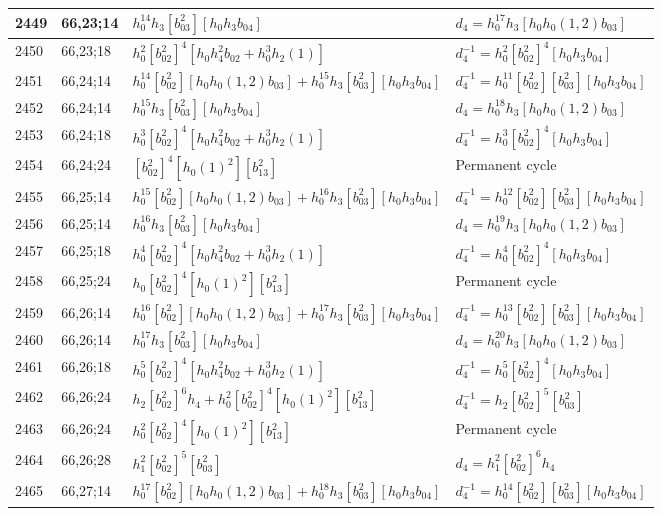 \documentclass{article}
\begin{document}
\begin{longtable}{|l|l|>{\raggedright\arraybackslash}p{6cm}|>{\raggedright\arraybackslash}p{6cm}|}
2449 & 66,23;14 & $h_0^{14}h_3[b_{03}^2][h_0h_3b_{04}]$ &$d_{4}=h_0^{17}h_3[h_0h_0(1, 2)b_{03}]$\\
\hline
2450 & 66,23;18 & $h_0^2[b_{02}^2]^4[h_0h_4^2b_{02} + h_0^3h_2(1)]$ & $d_{4}^{-1}=h_0^2[b_{02}^2]^4[h_0h_3b_{04}]$\\
\hline
2451 & 66,24;14 & $h_0^{14}[b_{02}^2][h_0h_0(1, 2)b_{03}] + h_0^{15}h_3[b_{03}^2][h_0h_3b_{04}]$ & $d_{4}^{-1}=h_0^{11}[b_{02}^2][b_{03}^2][h_0h_3b_{04}]$\\
2452 & 66,24;14 & $h_0^{15}h_3[b_{03}^2][h_0h_3b_{04}]$ &$d_{4}=h_0^{18}h_3[h_0h_0(1, 2)b_{03}]$\\
\hline
2453 & 66,24;18 & $h_0^3[b_{02}^2]^4[h_0h_4^2b_{02} + h_0^3h_2(1)]$ & $d_{4}^{-1}=h_0^3[b_{02}^2]^4[h_0h_3b_{04}]$\\
\hline
2454 & 66,24;24 & $[b_{02}^2]^4[h_0(1)^2][b_{13}^2]$ & Permanent cycle\\
\hline
2455 & 66,25;14 & $h_0^{15}[b_{02}^2][h_0h_0(1, 2)b_{03}] + h_0^{16}h_3[b_{03}^2][h_0h_3b_{04}]$ & $d_{4}^{-1}=h_0^{12}[b_{02}^2][b_{03}^2][h_0h_3b_{04}]$\\
2456 & 66,25;14 & $h_0^{16}h_3[b_{03}^2][h_0h_3b_{04}]$ &$d_{4}=h_0^{19}h_3[h_0h_0(1, 2)b_{03}]$\\
\hline
2457 & 66,25;18 & $h_0^4[b_{02}^2]^4[h_0h_4^2b_{02} + h_0^3h_2(1)]$ & $d_{4}^{-1}=h_0^4[b_{02}^2]^4[h_0h_3b_{04}]$\\
\hline
2458 & 66,25;24 & $h_0[b_{02}^2]^4[h_0(1)^2][b_{13}^2]$ & Permanent cycle\\
\hline
2459 & 66,26;14 & $h_0^{16}[b_{02}^2][h_0h_0(1, 2)b_{03}] + h_0^{17}h_3[b_{03}^2][h_0h_3b_{04}]$ & $d_{4}^{-1}=h_0^{13}[b_{02}^2][b_{03}^2][h_0h_3b_{04}]$\\
2460 & 66,26;14 & $h_0^{17}h_3[b_{03}^2][h_0h_3b_{04}]$ &$d_{4}=h_0^{20}h_3[h_0h_0(1, 2)b_{03}]$\\
\hline
2461 & 66,26;18 & $h_0^5[b_{02}^2]^4[h_0h_4^2b_{02} + h_0^3h_2(1)]$ & $d_{4}^{-1}=h_0^5[b_{02}^2]^4[h_0h_3b_{04}]$\\
\hline
2462 & 66,26;24 & $h_2[b_{02}^2]^6h_4 + h_0^2[b_{02}^2]^4[h_0(1)^2][b_{13}^2]$ & $d_{4}^{-1}=h_2[b_{02}^2]^5[b_{03}^2]$\\
2463 & 66,26;24 & $h_0^2[b_{02}^2]^4[h_0(1)^2][b_{13}^2]$ & Permanent cycle\\
\hline
2464 & 66,26;28 & $h_1^2[b_{02}^2]^5[b_{03}^2]$ &$d_{4}=h_1^2[b_{02}^2]^6h_4$\\
\hline
2465 & 66,27;14 & $h_0^{17}[b_{02}^2][h_0h_0(1, 2)b_{03}] + h_0^{18}h_3[b_{03}^2][h_0h_3b_{04}]$ & $d_{4}^{-1}=h_0^{14}[b_{02}^2][b_{03}^2][h_0h_3b_{04}]$\\

\end{longtable}
\end{document}
